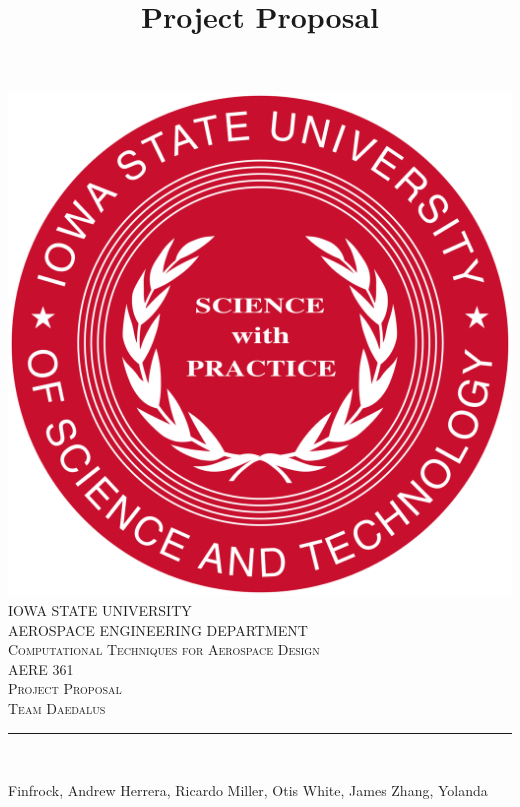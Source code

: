 \documentclass[12pt]{article}
\begin{document}
\title{Project Proposal}

\begin{titlepage}
	\centering
    \vspace*{0.5 cm}
    \includegraphics[scale = 0.11]{isu_seal.png}\\[1.0 cm]	%
    \textsc{\LARGE IOWA STATE UNIVERSITY}\\[2.0 cm]
    \textsc{\large AEROSPACE ENGINEERING DEPARTMENT}\\[0.2 cm]
    \textsc{\large Computational Techniques for Aerospace Design}\\[0.2 cm]
	\textsc{\Large AERE 361}\\[0.5 cm]				%
	\textsc{\Large Project Proposal}\\[0.2 cm]
	\textsc{\Large Team Daedalus}\\[0.2 cm]
	\rule{\linewidth}{0.2 mm} \\[0.4 cm]
	
	
	\begin{minipage}{0.8\textwidth}
		
			\begin{flushleft} 
			Finfrock, Andrew\linebreak
			Herrera, Ricardo\linebreak
			Miller, Otis\linebreak
			White, James\linebreak
			Zhang, Yolanda\linebreak
			
		\end{flushleft}
	\end{minipage}\\[2 cm]
	
	\vfill
	
\end{titlepage}
\end{document}
